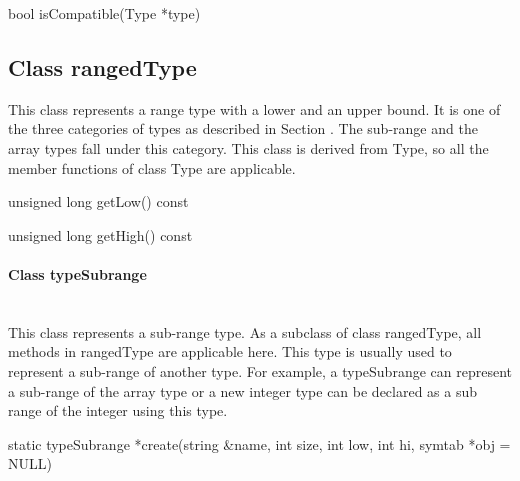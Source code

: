 \begin{apient}
bool isCompatible(Type *type)
\end{apient}

\subsection{Class rangedType}
This class represents a range type with a lower and an upper bound. It is one of the three categories of types as described in Section . The sub-range and the array types fall under this category. This class is derived from Type, so all the member functions of class Type are applicable.


\begin{apient}
unsigned long getLow() const
\end{apient}

\begin{apient}
unsigned long getHigh() const
\end{apient}

\paragraph{Class typeSubrange}
\mbox{ }\\

This class represents a sub-range type. As a subclass of class rangedType, all methods in rangedType are applicable here. This type is usually used to represent a sub-range of another type. For example, a typeSubrange can represent a sub-range of the array type or a new integer type can be declared as a sub range of the integer using this type.


\begin{apient}
static typeSubrange *create(string &name, int size, int low, int hi, 
                            symtab *obj = NULL) 
\end{apient}

